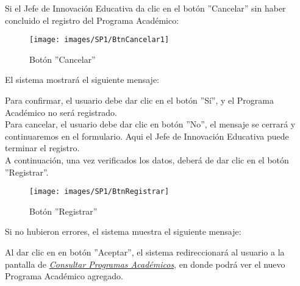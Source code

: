         Si el Jefe de Innovación Educativa da clic en el botón ''Cancelar'' sin haber concluido el registro del Programa Académico:

        \begin{figure}[!hbtp]
        	\centering
        	\hypertarget{cancel1}{\texttt{[image: images/SP1/BtnCancelar1]}}
        	\caption{Botón ''Cancelar''}
        	\label{cancel1}
        \end{figure}

        El sistema mostrará el siguiente mensaje:
        
        Para confirmar, el usuario debe dar clic en el botón ''Sí'', y el Programa Académico no será registrado.\\
        
        Para cancelar, el usuario debe dar clic en botón ''No'', el mensaje se cerrará y continuaremos en el formulario. Aqui el Jefe de Innovación Educativa puede terminar el registro.\\
        
        A continuación, una vez verificados los datos, deberá de dar clic en el botón ''Registrar''.
        \begin{figure}[!hbtp]
        	\centering
        	\hypertarget{btnreg}{\texttt{[image: images/SP1/BtnRegistrar]}}
        	\caption{Botón ''Registrar''}
        	\label{btnreg}
        \end{figure}

        Si no hubieron errores, el sistema muestra el siguiente mensaje:

        Al dar clic en en botón ''Aceptar'', el sistema redireccionará al usuario a la pantalla de \hyperlink{consultarpa}{\textit{Consultar Programas Académicos}}, en donde podrá ver el nuevo Programa Académico agregado.\\

